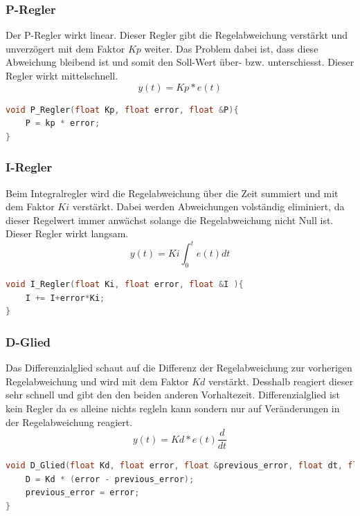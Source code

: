 \documentclass[12pt,a4paper, ngerman]{article}
\begin{document}
\subsubsection{P-Regler}
Der P-Regler wirkt linear. Dieser Regler gibt die Regelabweichung verstärkt und unverzögert mit dem Faktor $Kp$ weiter. Das Problem dabei ist, dass diese Abweichung bleibend ist und somit den Soll-Wert über- bzw. unterschiesst. Dieser Regler wirkt mittelschnell.\cite{website:rn-wissen_Regelungstechnik}\\
\begin{equation}
y(t)=Kp*e(t)
\end{equation}
\begin{lstlisting}[language=C++,caption=P-Regler C++ Pseudocode]
void P_Regler(float Kp, float error, float &P){
	P = kp * error;
}
\end{lstlisting}

\subsubsection{I-Regler}
Beim Integralregler wird die Regelabweichung über die Zeit summiert und mit dem Faktor $Ki$ verstärkt. Dabei werden Abweichungen volständig eliminiert, da dieser Regelwert immer anwächst solange die Regelabweichung nicht Null ist. Dieser Regler wirkt langsam.\cite{website:rn-wissen_Regelungstechnik}\\
\begin{equation}
y(t)=Ki\int_{0}^{t}e(t)dt
\end{equation}
\begin{lstlisting}[language=C++,caption=I-Regler C++ Pseudocode]
void I_Regler(float Ki, float error, float &I ){
	I += I+error*Ki;
}
\end{lstlisting}

\subsubsection{D-Glied}
Das Differenzialglied schaut auf die Differenz der Regelabweichung zur vorherigen Regelabweichung und wird mit dem Faktor $Kd$ verstärkt. Desshalb reagiert dieser sehr schnell und gibt den den beiden anderen Vorhaltezeit. Differenzialglied ist kein Regler da es alleine nichts regleln kann sondern nur auf Veränderungen in der Regelabweichung reagiert.\cite{website:rn-wissen_Regelungstechnik}\\
\begin{equation}
y(t)=Kd*e(t)\frac{d}{dt}
\end{equation}
\begin{lstlisting}[language=C++,caption=D-Regler C++ Pseudocode]
void D_Glied(float Kd, float error, float &previous_error, float dt, float &D){
	D = Kd * (error - previous_error);
	previous_error = error;
}
\end{lstlisting}
\end{document}

